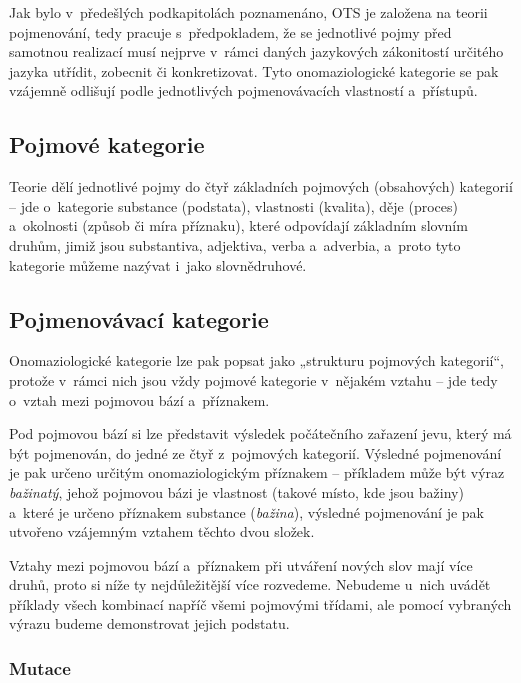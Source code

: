 Jak bylo v~předešlých podkapitolách poznamenáno, OTS je založena na
teorii pojmenování, tedy pracuje s~předpokladem, že se jednotlivé pojmy
před samotnou realizací musí nejprve v~rámci daných jazykových
zákonitostí určitého jazyka utřídit, zobecnit či konkretizovat. Tyto
onomaziologické kategorie se pak vzájemně odlišují podle jednotlivých
pojmenovávacích vlastností a~přístupů.~\parencite[29]{dokulil62}

\hypertarget{pojmovuxe9-kategorie}{%
\subsection{Pojmové kategorie}\label{pojmovuxe9-kategorie}}

Teorie dělí jednotlivé pojmy do čtyř základních pojmových (obsahových)
kategorií -- jde o~kategorie substance (podstata), vlastnosti (kvalita),
děje (proces) a~okolnosti (způsob či míra příznaku), které odpovídají
základním slovním druhům, jimiž jsou substantiva, adjektiva, verba
a~adverbia, a~proto tyto kategorie můžeme nazývat i~jako slovnědruhové.
\parencite[102]{dokulil00}

\hypertarget{pojmenovuxe1vacuxed-kategorie}{%
\subsection{Pojmenovávací
kategorie}\label{pojmenovuxe1vacuxed-kategorie}}

Onomaziologické kategorie lze pak popsat jako „strukturu pojmových
kategorií``, protože v~rámci nich jsou vždy pojmové kategorie v~nějakém
vztahu -- jde tedy o~vztah mezi pojmovou bází a~příznakem.
\parencite{enc-onomaz-kateg17}

Pod pojmovou bází si lze představit výsledek počátečního zařazení jevu,
který má být pojmenován, do jedné ze čtyř z~pojmových kategorií.
Výsledné pojmenování je pak určeno určitým onomaziologickým příznakem --
příkladem může být výraz \emph{bažinatý}, jehož pojmovou bázi je
vlastnost (takové místo, kde jsou bažiny) a~které je určeno příznakem
substance (\emph{bažina}), výsledné pojmenování je pak utvořeno
vzájemným vztahem těchto dvou složek.~\parencite[29]{dokulil62}

Vztahy mezi pojmovou bází a~příznakem při utváření nových slov mají více
druhů, proto si níže ty nejdůležitější více rozvedeme. Nebudeme u~nich
uvádět příklady všech kombinací napříč všemi pojmovými třídami, ale
pomocí vybraných výrazu budeme demonstrovat jejich podstatu.

\hypertarget{mutace}{%
\subsubsection{Mutace}\label{mutace}}

